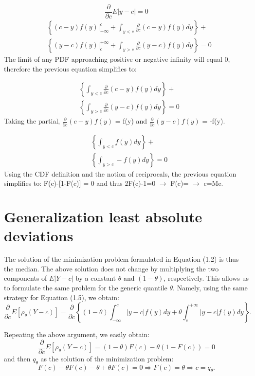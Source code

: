 \documentclass[
  letterpaper,
  DIV=11,
  numbers=noendperiod]{scrreprt}
\begin{document}
\[
\frac{\partial}{\partial c}E|y-c|=0
\] \[
\begin{aligned}
& \left\{\left.(c-y) f(y)\right|_{-\infty} ^c+\int_{y<c} \frac{\partial}{\partial c}(c-y) f(y) d y\right\}+ \\
& \left\{\left.(y-c) f(y)\right|_c ^{+\infty}+\int_{y>c} \frac{\partial}{\partial c}(y-c) f(y) d y\right\}=0
\end{aligned}
\] The limit of any PDF approaching positive or negative infinity will
equal 0, therefore the previous equation simplifies to:

\[
\begin{aligned}
& \left\{\int_{y<c} \frac{\partial}{\partial c}(c-y) f(y) d y\right\}+ \\
& \left\{\int_{y>c} \frac{\partial}{\partial c}(y-c) f(y) d y\right\}=0
\end{aligned}
\] Taking the partial, \(\frac{\partial}{\partial c}(c-y)f(y)\) = f(y)
and \(\frac{\partial}{\partial c}(y-c)f(y)\) = -f(y).

\[
\begin{aligned}
& \left\{\int_{y<c} f(y) d y\right\}+ \\
& \left\{\int_{y>c} -f(y) d y\right\}=0
\end{aligned}
\] Using the CDF definition and the notion of reciprocals, the previous
equation simplifies to: F(c)-{[}1-F(c){]} = 0 and thus 2F(c)-1=0
\(\longrightarrow\) F(c)= \(\longrightarrow\) c=Me.

\hypertarget{generalization-least-absolute-deviations}{%
\chapter{Generalization least absolute
deviations}\label{generalization-least-absolute-deviations}}

The solution of the minimization problem formulated in Equation (1.2) is
thus the median. The above solution does not change by multiplying the
two components of \(E|Y-c|\) by a constant \(\theta\) and
\((1-\theta)\), respectively. This allows us to formulate the same
problem for the generic quantile \(\theta\). Namely, using the same
strategy for Equation (1.5), we obtain: \[
\frac{\partial}{\partial c} E\left[\rho_\theta(Y-c)\right]=\frac{\partial}{\partial c}\left\{(1-\theta) \int_{-\infty}^c|y-c| f(y) d y+\theta \int_c^{+\infty}|y-c| f(y) d y\right\} .
\]

Repeating the above argument, we easily obtain: \[
\frac{\partial}{\partial c} E\left[\rho_\theta(Y-c)\right]=(1-\theta) F(c)-\theta(1-F(c))=0
\] and then \(q_\theta\) as the solution of the minimization problem: \[
F(c)-\theta F(c)-\theta+\theta F(c)=0 \Longrightarrow F(c)=\theta \Longrightarrow c=q_\theta .
\]
\end{document}
